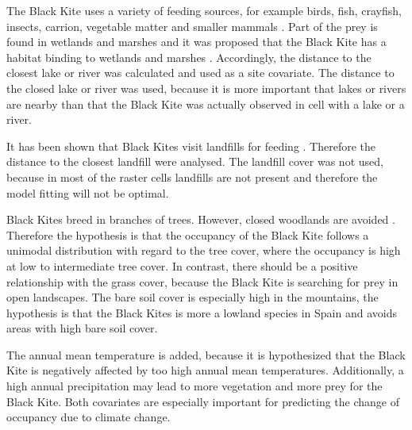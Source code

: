 \begin{multicols}{2}
The Black Kite uses a variety of feeding sources, for example birds, fish, crayfish, insects, carrion, vegetable matter and smaller mammals \parencite{Sergio1999,Vinuela1992, BirdLife2021}. Part of the prey is found in wetlands and marshes and it was proposed that the Black Kite has a habitat binding to wetlands and marshes \parencite{Veiga1990, Tanferna2013}. Accordingly, the distance to the closest lake or river was calculated and used as a site covariate. The distance to the closed lake or river was used, because it is more important that lakes or rivers are nearby than that the Black Kite was actually observed in cell with a lake or a river. 

It has been shown that Black Kites visit landfills for feeding \parencite{DeGiacomo2008, Blanco1994}. Therefore the distance to the closest landfill were analysed. The landfill cover was not used, because in most of the raster cells landfills are not present and therefore the model fitting will not be optimal.

Black Kites breed in branches of trees. However, closed woodlands are avoided \parencite{Tanferna2013}. Therefore the hypothesis is that the occupancy of the Black Kite follows a unimodal distribution with regard to the tree cover, where the occupancy is high at low to intermediate tree cover. In contrast, there should be a positive relationship with the grass cover, because the Black Kite is searching for prey in open landscapes. The bare soil cover is especially high in the mountains, the hypothesis is that the Black Kites is more a lowland species in Spain and avoids areas with high bare soil cover.

The annual mean temperature is added, because it is hypothesized that the Black Kite is negatively affected by too high annual mean temperatures. Additionally, a high annual precipitation may lead to more vegetation and more prey for the Black Kite. Both covariates are especially important for predicting the change of occupancy due to climate change.   




\end{multicols}
